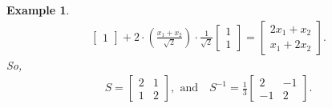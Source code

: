 \documentclass[12pt,titlepage]{amsart}
\newtheorem{exam}[thm]{Example}
\theoremstyle{definition}
\theoremstyle{remark}
\begin{document}
\begin{exam}
\begin{eqnarray*}
\begin{bmatrix}
1\end{bmatrix} + 2 \cdot \left( \frac{x_1 + x_2}{\sqrt{2}} \right)
\cdot \frac{1}{\sqrt{2}} \begin{bmatrix}1 \\ 1\end{bmatrix}= \begin{bmatrix}2x_1 + x_2 \\
x_1 + 2x_2\end{bmatrix}.
\end{eqnarray*}
So,
\begin{eqnarray*}
S =\begin{bmatrix} 2 & 1 \\ 1 & 2 \end{bmatrix}, \,\ \mbox{and} \quad S^{-1} = \frac{1}{3} \begin{bmatrix} 2 & -1 \\
-1 & 2
\end{bmatrix}.
\end{eqnarray*}


\end{exam}
\end{document}
